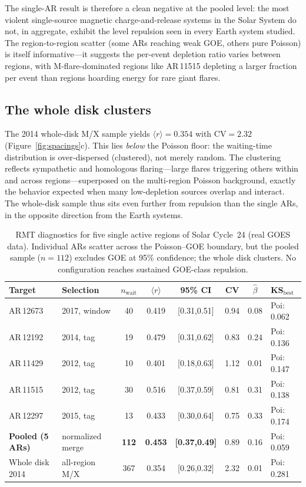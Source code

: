\documentclass[12pt,a4paper]{article}
\begin{document}
The single-AR result is therefore a clean negative at the pooled level: the most violent single-source magnetic charge-and-release systems in the Solar System do not, in aggregate, exhibit the level repulsion seen in every Earth system studied. The region-to-region scatter (some ARs reaching weak GOE, others pure Poisson) is itself informative---it suggests the per-event depletion ratio varies between regions, with M-flare-dominated regions like AR\,11515 depleting a larger fraction per event than regions hoarding energy for rare giant flares.

\subsection{The whole disk clusters}

The 2014 whole-disk M/X sample yields $\langle r\rangle=0.354$ with $\mathrm{CV}=2.32$ (Figure~\ref{fig:spacings}c). This lies \emph{below} the Poisson floor: the waiting-time distribution is over-dispersed (clustered), not merely random. The clustering reflects sympathetic and homologous flaring---large flares triggering others within and across regions---superposed on the multi-region Poisson background, exactly the behavior expected when many low-depletion sources overlap and interact. The whole-disk sample thus sits even further from repulsion than the single ARs, in the opposite direction from the Earth systems.

\begin{table}[H]
\centering
\caption{RMT diagnostics for five single active regions of Solar Cycle~24 (real GOES data). Individual ARs scatter across the Poisson--GOE boundary, but the pooled sample ($n=112$) excludes GOE at 95\% confidence; the whole disk clusters. No configuration reaches sustained GOE-class repulsion.}
\label{tab:main}
\small
\begin{tabular}{llcccccl}
\toprule
Target & Selection & $n_{\mathrm{wait}}$ & $\langle r\rangle$ & 95\% CI & CV & $\hat\beta$ & KS$_{\mathrm{best}}$ \\
\midrule
AR\,12673 & 2017, window & 40 & 0.419 & [0.31,0.51] & 0.94 & 0.08 & Poi: 0.062 \\
AR\,12192 & 2014, tag & 19 & 0.479 & [0.31,0.62] & 0.83 & 0.24 & Poi: 0.136 \\
AR\,11429 & 2012, tag & 10 & 0.401 & [0.18,0.63] & 1.12 & 0.01 & Poi: 0.147 \\
AR\,11515 & 2012, tag & 30 & 0.516 & [0.37,0.59] & 0.81 & 0.31 & Poi: 0.138 \\
AR\,12297 & 2015, tag & 13 & 0.433 & [0.30,0.64] & 0.75 & 0.33 & Poi: 0.174 \\
\textbf{Pooled (5 ARs)} & normalized merge & \textbf{112} & \textbf{0.453} & \textbf{[0.37,0.49]} & 0.89 & 0.16 & Poi: 0.059 \\
Whole disk 2014 & all-region M/X & 367 & 0.354 & [0.26,0.32] & 2.32 & 0.01 & Poi: 0.281 \\
\bottomrule
\end{tabular}
\end{table}
\end{document}
